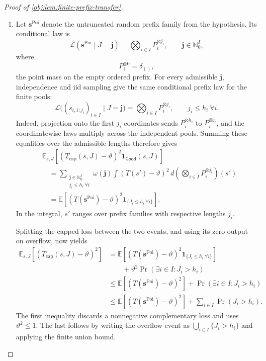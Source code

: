 \documentclass[11pt]{article}
\begin{document}
\begin{proof}[Proof of \cref{obj:lem:finite-prefix-transfer}]
\begin{enumerate}
\item Let \(\boldsymbol s^{\mathrm{Poi}}\) denote the untruncated random prefix family from the hypothesis. Its conditional law is
\[
\mathcal L(\boldsymbol s^{\mathrm{Poi}}\mid J=\mathbf j)
=
\bigotimes_{i\in I}P_i^{\otimes j_i},
\qquad
\mathbf j\in\mathbb N_0^I,
\]
where
\[
P_i^{\otimes0}=\delta_{()},
\]
the point mass on the empty ordered prefix. For every admissible \(\mathbf j\), independence and iid sampling give the same conditional prefix law for the finite pools:
\[
\mathcal L\bigl((s_{i,1:j_i})_{i\in I}\mid J=\mathbf j\bigr)
=
\bigotimes_{i\in I}P_i^{\otimes j_i},
\qquad j_i\le h_i\ \forall i.
\]
Indeed, projection onto the first \(j_i\) coordinates sends
\(P_i^{\otimes h_i}\) to \(P_i^{\otimes j_i}\), and the coordinatewise laws multiply across the independent pools. Summing these equalities over the admissible lengths therefore gives
\[
\begin{aligned}
&\mathbb E_{s,J}\!\left[
(T_{\mathrm{cap}}(s,J)-\vartheta)^2
\mathbf1_{\mathsf{Good}}(s,J)\right]\\
&\quad=
\sum_{\substack{\mathbf j\in\mathbb N_0^I\\j_i\le h_i\ \forall i}}
\omega(\mathbf j)
\int
(T(s')-\vartheta)^2\,
d\!\left(\bigotimes_{i\in I}P_i^{\otimes j_i}\right)(s')\\
&\quad=
\mathbb E\!\left[
(T(\boldsymbol s^{\mathrm{Poi}})-\vartheta)^2
\mathbf1_{\{J_i\le h_i\ \forall i\}}\right].
\end{aligned}
\]
In the integral, \(s'\) ranges over prefix families with respective lengths \(j_i\). %

Splitting the capped loss between the two events, and using its zero output on overflow, now yields
\[
\begin{aligned}
\mathbb E_{s,J}[(T_{\mathrm{cap}}(s,J)-\vartheta)^2]
&=
\mathbb E\!\left[
(T(\boldsymbol s^{\mathrm{Poi}})-\vartheta)^2
\mathbf1_{\{J_i\le h_i\ \forall i\}}\right]\\
&\qquad+
\vartheta^2\Pr(\exists i\in I:J_i>h_i)\\
&\le
\mathbb E[(T(\boldsymbol s^{\mathrm{Poi}})-\vartheta)^2]
+\Pr(\exists i\in I:J_i>h_i)\\
&\le
\mathbb E[(T(\boldsymbol s^{\mathrm{Poi}})-\vartheta)^2]
+\sum_{i\in I}\Pr(J_i>h_i).
\end{aligned}
\]
The first inequality discards a nonnegative complementary loss and uses
\(\vartheta^2\le1\). The last follows by writing the overflow event as
\(\bigcup_{i\in I}\{J_i>h_i\}\) and applying the finite union bound. %


\end{enumerate}
\end{proof}
\end{document}
